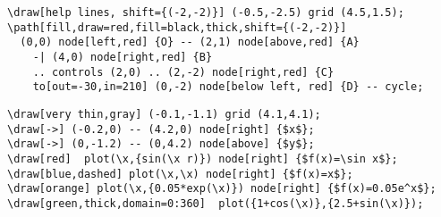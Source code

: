 \begin{frame}[fragile]
  \scriptsize
  \begin{verbatim}
\draw[help lines, shift={(-2,-2)}] (-0.5,-2.5) grid (4.5,1.5);
\path[fill,draw=red,fill=black,thick,shift={(-2,-2)}]
  (0,0) node[left,red] {O} -- (2,1) node[above,red] {A}
    -| (4,0) node[right,red] {B}
    .. controls (2,0) .. (2,-2) node[right,red] {C}
    to[out=-30,in=210] (0,-2) node[below left, red] {D} -- cycle;
  \end{verbatim}
  \normalsize
  \begin{center}
  \end{center}
\end{frame}

\begin{frame}[fragile]
  \footnotesize
  \begin{verbatim}
\draw[very thin,gray] (-0.1,-1.1) grid (4.1,4.1);
\draw[->] (-0.2,0) -- (4.2,0) node[right] {$x$};
\draw[->] (0,-1.2) -- (0,4.2) node[above] {$y$};
\draw[red]  plot(\x,{sin(\x r)}) node[right] {$f(x)=\sin x$};
\draw[blue,dashed] plot(\x,\x) node[right] {$f(x)=x$};
\draw[orange] plot(\x,{0.05*exp(\x)}) node[right] {$f(x)=0.05e^x$};
\draw[green,thick,domain=0:360]  plot({1+cos(\x)},{2.5+sin(\x)});
  \end{verbatim}
  \normalsize
\end{frame}

\begin{frame}
  \begin{center}
  \end{center}
\end{frame}

